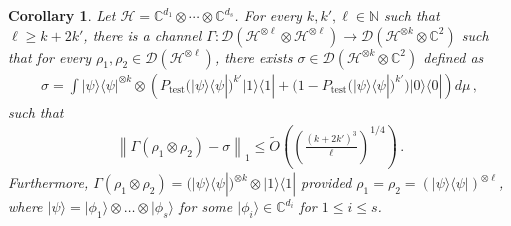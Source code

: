\documentclass[10pt,a4paper]{article}
\newtheorem{corollary}[theorem]{Corollary}
\theoremstyle{remark}
\def\to{\rightarrow}
\def\cal{\mathcal}
\newcommand{\mper}{\,.}
\newcommand{\mcom}{\,,}
\newcommand{\C}{{\mathbb C}}
\newcommand{\N}{{\mathbb{N}}}
\newcommand{\norm}[1]{\ensuremath{\left\lVert #1 \right\rVert}}
\newcommand{\calD}{{\cal D}}
\newcommand{\calH}{{\cal H}}
\newcommand{\1}[1]{\mathds{1}{[#1]}}
\newcommand{\ket}[1]{\lvert #1\rangle}
\newcommand{\bra}[1]{\langle#1|}
\numberwithin{equation}{section}
\begin{document}
\begin{corollary} \label{cor:separable-states}
  Let $\calH = \C^{d_1} \otimes \cdots \otimes \C^{d_s}$. For every $k,k',\ell \in \N$ such that $\ell\ge k+2k'$, there is a channel $\Gamma \colon \calD( \calH^{\otimes \ell} \otimes \calH^{\otimes \ell}) \to
  \calD(\calH^{\otimes k} \otimes \C^2)$ such that for every $\rho_1,\rho_2 \in \calD( \calH^{\otimes \ell})$, there exists $\sigma \in \calD(\calH^{\otimes k} \otimes \C^2)$
  defined as
  \begin{align*}
    \sigma = \int \ket{\psi}\bra{\psi}^{\otimes k} \otimes \left( P_{\text{test}}(\ket{\psi}\bra{\psi})^{k'}  \ket{1}\bra{1} +  (1-P_{\text{test}}(\ket{\psi}\bra{\psi})^{k'}) \ket{0}\bra{0} \right) d\mu\mcom
  \end{align*}
  such that
  \begin{align*}
    \norm{\Gamma(\rho_1 \otimes \rho_2) -  \sigma}_1 \le \tilde O\left(\left(\frac{(k+2k')^3}{\ell}\right)^{1/4}\right)\mper
  \end{align*}
  Furthermore, $\Gamma(\rho_1 \otimes \rho_2) = (\ket{\psi}\bra{\psi})^{\otimes k} \otimes \ket{1}\bra{1}$ provided
  $\rho_1 = \rho_2 = (\ket{\psi}\bra{\psi})^{\otimes \ell}$, where
  $\ket{\psi} = \ket{\phi_1}\otimes \ldots \otimes \ket{\phi_s}$ for some $\ket{\phi_i} \in \C^{d_i}$ for $1 \le i \le s$.
\end{corollary}  
\end{document}
